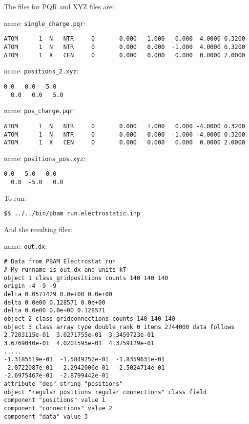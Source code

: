The files for PQR and XYZ files are: 

name:  \texttt{single\_charge.pqr}:
\begin{lstlisting}[style = MyBash]
ATOM      1  N   NTR     0       0.000   1.000   0.000  4.0000 0.3200
ATOM      1  N   NTR     0       0.000   0.000  -1.000  4.0000 0.3200
ATOM      1  X   CEN     0       0.000   0.000   0.000  0.0000 2.0000
\end{lstlisting}

\medskip

name:  \texttt{positions\_2.xyz}:
\begin{lstlisting}[style = MyBash]
  0.0   0.0  -5.0
  0.0   0.0   5.0
\end{lstlisting}
\medskip

name:  \texttt{pos\_charge.pqr}:
\begin{lstlisting}[style = MyBash]
ATOM      1  N   NTR     0       0.000   1.000   0.000 -4.0000 0.3200
ATOM      1  N   NTR     0       0.000   0.000  -1.000 -4.0000 0.3200
ATOM      1  X   CEN     0       0.000   0.000   0.000  0.0000 2.0000
\end{lstlisting}

\medskip

name:  \texttt{positions\_pos.xyz}:
\begin{lstlisting}[style = MyBash]
  0.0   5.0   0.0
  0.0  -5.0   0.0
\end{lstlisting}
\medskip

To run: 
\begin{lstlisting}[style = MyBash]
$$ ../../bin/pbam run.electrostatic.inp
\end{lstlisting}
\medskip

And the resulting files: 

name: \texttt{out.dx}:
\begin{lstlisting}[style = MyBash]
# Data from PBAM Electrostat run
# My runname is out.dx and units kT
object 1 class gridpositions counts 140 140 140
origin -4 -9 -9
delta 0.0571429 0.0e+00 0.0e+00
delta 0.0e00 0.128571 0.0e+00
delta 0.0e00 0.0e+00 0.128571
object 2 class gridconnections counts 140 140 140
object 3 class array type double rank 0 items 2744000 data follows
2.7203115e-01  3.0271755e-01  3.3459723e-01  
3.6769040e-01  4.0201595e-01  4.3759129e-01 
.....
-1.3185519e-01  -1.5849252e-01  -1.8359631e-01
-2.0722087e-01  -2.2942006e-01  -2.5024714e-01
-2.6975467e-01  -2.8799442e-01
attribute "dep" string "positions"
object "regular positions regular connections" class field
component "positions" value 1
component "connections" value 2
component "data" value 3
\end{lstlisting}
\medskip

